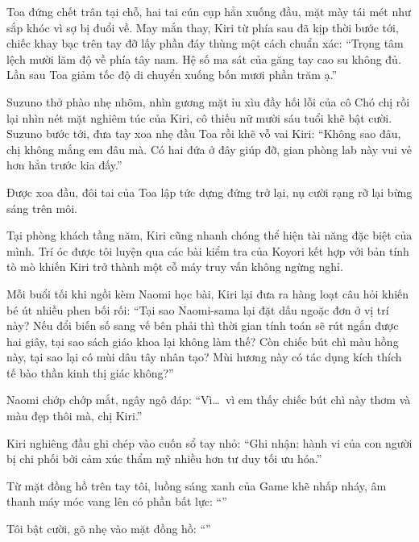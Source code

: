 \documentclass[../main.tex]{subfiles}
\begin{document}
Toa đứng chết trân tại chỗ, hai tai cún cụp hẳn xuống đầu, mặt mày tái mét như sắp khóc vì sợ bị đuổi về. May mắn thay, Kiri từ phía sau đã kịp thời bước tới, chiếc khay bạc trên tay đỡ lấy phần đáy thùng một cách chuẩn xác: ``Trọng tâm lệch mười lăm độ về phía tây nam. Hệ số ma sát của găng tay cao su không đủ. Lần sau Toa giảm tốc độ di chuyển xuống bốn mươi phần trăm ạ.''

Suzuno thở phào nhẹ nhõm, nhìn gương mặt ỉu xìu đầy hối lỗi của cô Chó chị rồi lại nhìn nét mặt nghiêm túc của Kiri, cô thiếu nữ mười sáu tuổi khẽ bật cười. Suzuno bước tới, đưa tay xoa nhẹ đầu Toa rồi khẽ vỗ vai Kiri: ``Không sao đâu, chị không mắng em đâu mà. Có hai đứa ở đây giúp đỡ, gian phòng lab này vui vẻ hơn hẳn trước kia đấy.''

Được xoa đầu, đôi tai của Toa lập tức dựng đứng trở lại, nụ cười rạng rỡ lại bừng sáng trên môi.

\ct

Tại phòng khách tầng năm, Kiri cũng nhanh chóng thể hiện tài năng đặc biệt của mình. Trí óc được tôi luyện qua các bài kiểm tra của Koyori kết hợp với bản tính tò mò khiến Kiri trở thành một cỗ máy truy vấn không ngừng nghỉ.

Mỗi buổi tối khi ngồi kèm Naomi học bài, Kiri lại đưa ra hàng loạt câu hỏi khiến bé út nhiều phen bối rối: ``Tại sao Naomi-sama lại đặt dấu ngoặc đơn ở vị trí này? Nếu đổi biến số sang vế bên phải thì thời gian tính toán sẽ rút ngắn được hai giây, tại sao sách giáo khoa lại không làm thế? Còn chiếc bút chì màu hồng này, tại sao lại có mùi dâu tây nhân tạo? Mùi hương này có tác dụng kích thích tế bào thần kinh thị giác không?''

Naomi chớp chớp mắt, ngây ngô đáp: ``Vì\dots\ vì em thấy chiếc bút chì này thơm và màu đẹp thôi mà, chị Kiri.''

Kiri nghiêng đầu ghi chép vào cuốn sổ tay nhỏ: ``Ghi nhận: hành vi của con người bị chi phối bởi cảm xúc thẩm mỹ nhiều hơn tư duy tối ưu hóa.''

Từ mặt đồng hồ trên tay tôi, luồng sáng xanh của Game khẽ nhấp nháy, âm thanh máy móc vang lên có phần bất lực: ``''

Tôi bật cười, gõ nhẹ vào mặt đồng hồ: ``''
\end{document}
